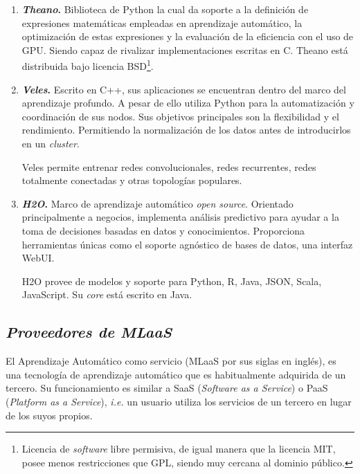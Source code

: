 \begin{enumerate}
\item \textbf{\textit{Theano}.}
Biblioteca de Python la cual da soporte a la definición  de expresiones matemáticas empleadas en aprendizaje automático, la optimización de estas expresiones y la evaluación de la eficiencia con el uso de GPU. Siendo capaz de rivalizar implementaciones escritas en C. Theano está distribuida bajo licencia BSD\footnote{Licencia de \textit{software} libre permisiva, de igual manera que la licencia MIT, posee menos restricciones que GPL, siendo muy cercana al dominio público.}.

\item \textbf{\textit{Veles}.}
Escrito en C++, sus aplicaciones se encuentran dentro del marco del aprendizaje profundo. A pesar de ello utiliza Python para la automatización y coordinación de sus nodos. Sus objetivos principales son la flexibilidad y el rendimiento. Permitiendo la normalización de los datos antes de introducirlos en un \textit{cluster}.

Veles permite entrenar redes convolucionales, redes recurrentes, redes totalmente conectadas y otras topologías populares.

\item \textbf{\textit{H2O}.}
Marco de aprendizaje automático \textit{open source}. Orientado principalmente a negocios, implementa análisis predictivo para ayudar a la toma de decisiones basadas en datos y conocimientos. Proporciona herramientas únicas como el soporte agnóstico de bases de datos, una interfaz WebUI. 

H2O provee de modelos y soporte para Python, R, Java, JSON, Scala, JavaScript. Su \textit{core} está escrito en Java.

\end{enumerate}

\subsection{\textit{Proveedores de MLaaS}}\label{related:MLaaS}
El Aprendizaje Automático como servicio (MLaaS por sus siglas en inglés), es una tecnología de aprendizaje automático que es habitualmente adquirida de un tercero. Su funcionamiento es similar a SaaS (\textit{Software as a Service}) o PaaS (\textit{Platform as a Service}), \textit{i.e.} un usuario utiliza los servicios de un tercero en lugar de los suyos propios.

